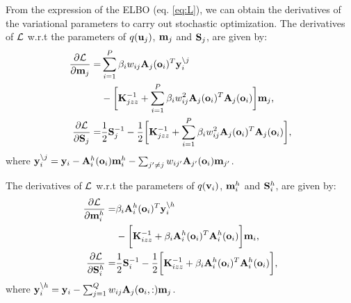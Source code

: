 \newcommand{\Lgj}{\calL^g_j}
\newcommand{\ynoj}{\y_i^{\backslash j}}
\newcommand{\Kjzz}{\mat{K}_{jzz}}
From the expression of the ELBO (eq. \ref{eq:L}), we can obtain the derivatives of the variational parameters to carry out stochastic optimization.
The derivatives of $\calL$ w.r.t the parameters of $q(\u_j)$, $\m_j$ and $\S_j$, are given by:
\begin{align}
\nonumber
\deriv{\calL}{\m_j} 
=& \sum_{i=1}^P \beta_i w_{ij} \A_j(\oi)^T \ynoj \\
&- \bigg[\Kjzz^{-1} + \sum_{i=1}^P \beta_i w_{ij}^2 \A_j(\oi)^T \A_j(\oi) \bigg] \m_j \text{,} \\
\deriv{\calL}{\S_j} 
=& \frac{1}{2} \S_j^{-1} - \frac{1}{2} \bigg[ \Kjzz^{-1} + \sum_{i=1}^P \beta_i w_{ij}^2 \A_j(\oi)^T \A_j(\oi) \bigg],
\end{align}
where $\y_i^{\backslash j} = \y_i - \Ahi(\oi) \mhi - \sum_{j' \neq j} w_{ij'} \A_{j'}(\oi) \m_{j'}$.

\newcommand{\Lhi}{\calL^h_i}
\newcommand{\Kizz}{\mat{K}_{izz}}
\noindent The derivatives of $\calL$ w.r.t the parameters of $q(\v_i)$, $\mhi$ and $\Shi$, are given by:
\newcommand{\ynoh}{\y_i^{\backslash h}}
\begin{align}
\nonumber
\deriv{\calL}{\mhi}
= & \beta_i \Ahi(\oi)^T \ynoh  \\
&- \bigg[\Kizz^{-1} +  \beta_i \Ahi(\oi)^T \Ahi(\oi) \bigg] \m_i \text{,} \\
\deriv{\calL}{\Shi} 
=& \frac{1}{2} \S_i^{-1} - \frac{1}{2} \bigg[ \Kizz^{-1} + \beta_i \Ahi(\oi)^T \Ahi(\oi) \bigg] ,
\end{align}
where $\ynoh = \y_i - \sum_{j=1}^Q w_{ij} \A_j(\oi,:) \m_j$.

